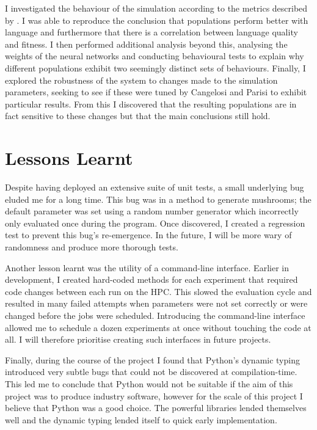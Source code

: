 \documentclass[12pt,a4paper]{report}
\begin{document}
I investigated the behaviour of the simulation according to the metrics described by \citet{Cangelosi1998}. I was able to reproduce the conclusion that populations perform better with language and furthermore that there is a correlation between language quality and fitness. I then performed additional analysis beyond this, analysing the weights of the neural networks and conducting behavioural tests to explain why different populations exhibit two seemingly distinct sets of behaviours. Finally, I explored the robustness of the system to changes made to the simulation parameters, seeking to see if these were tuned by Cangelosi and Parisi to exhibit particular results. From this I discovered that the resulting populations are in fact sensitive to these changes but that the main conclusions still hold.

\section{Lessons Learnt}

Despite having deployed an extensive suite of unit tests, a small underlying bug eluded me for a long time. This bug was in a method to generate mushrooms; the default parameter was set using a random number generator which incorrectly only evaluated once during the program. Once discovered, I created a regression test to prevent this bug's re-emergence. In the future, I will be more wary of randomness and produce more thorough tests. 

Another lesson learnt was the utility of a command-line interface. Earlier in development, I created hard-coded methods for each experiment that required code changes between each run on the HPC. This slowed the evaluation cycle and resulted in many failed attempts when parameters were not set correctly or were changed before the jobs were scheduled. Introducing the command-line interface allowed me to schedule a dozen experiments at once without touching the code at all. I will therefore prioritise creating such interfaces in future projects.

Finally, during the course of the project I found that Python's dynamic typing introduced very subtle bugs that could not be discovered at compilation-time. This led me to conclude that Python would not be suitable if the aim of this project was to produce industry software, however for the scale of this project I believe that Python was a good choice. The powerful libraries lended themselves well and the dynamic typing lended itself to quick early implementation.
\end{document}
